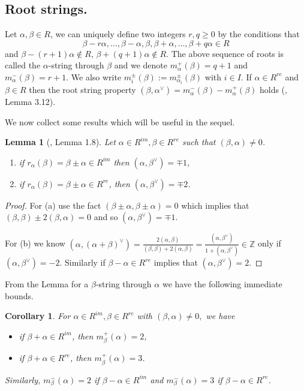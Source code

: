 \documentclass[11pt]{amsart}
\theoremstyle{plain}
\newtheorem{lemma}[thm]{Lemma}
\newtheorem{cor}[thm]{Corollary}
\theoremstyle{definition}
\numberwithin{equation}{section}
\newcommand{\al}{\alpha}
\newcommand{\be}{\beta}
\newcommand{\Z}{\mbox{$\mathbb Z$}}
\begin{document}
\subsection{Root strings.}	Let $\al,\be\in R$, we can uniquely define two integers $r,q\geq0$ by the conditions that $$\be-r\al,\ldots,\be-\al,\be,\be+\al,\ldots,\be+q\al\in R$$ and $\be-(r+1)\al\notin R$, $\be+(q+1)\al\notin R$. The above sequence of roots is called the $\al$-string through $\be$ and we denote $m_{\al}^+(\be)=q+1$ and $m_{\al}^-(\be)=r+1$. We also write $m_i^{\pm}(\be):=m_{\al_i}^{\pm}(\be)$ with $i\in I$. If $\al\in R^{re}$ and $\be\in R$ then the root string property $(\be,\al^{\vee})=m_{\al}^-(\be)-m_{\al}^+(\be)$ holds (\cite{yousofzadeh2017locally}, Lemma 3.12).

	We now collect some results which will be useful in the sequel.
	\begin{lemma}[\cite{serganova1996generalizations}, Lemma 1.8]\label{lem2} Let $\al\in R^{im},\be\in R^{re}$ such that $(\be,\al)\neq 0$.
		\begin{enumerate}
			\item if $r_{\al}(\be)=\be\pm\al\in R^{im}$ then $(\al,\be^{\vee})=\mp1$,
			\item if $r_{\al}(\be)=\be\pm\al\in R^{re}$, then $(\al,\be^{\vee})=\mp2$.
		\end{enumerate}
	\end{lemma}
	\begin{proof} For (a) use the fact $(\be\pm\al,\be\pm\al)=0$ which implies that $(\be,\be)\pm2(\be,\al)=0$ and so $(\al,\be^{\vee})=\mp1$. 
		
		For (b) we know $(\al,(\al+\be)^{\vee})=\frac{2(\al,\be)}{(\be,\be)+2(\al,\be)}=\frac{(\al,\be^{\vee})}{1+(\al,\be^{\vee})}\in\Z$	only if $(\al,\be^{\vee})=-2$. Similarly if $\be-\al\in R^{re}$ implies that $(\al,\be^{\vee})=2$.
	\end{proof}
From the Lemma for a $\be$-string through $\al$ we have the following immediate bounds.
    \begin{cor}\label{cor1}
		For $\al\in R^{im},\be\in R^{re}$ with $(\be,\al)\neq0,$ we have
		\begin{itemize}
			\item[(a)] if $\be+\al\in R^{im}$, then $m_{\be}^+(\al)=2$,
			\item [(b)] if $\be+\al\in R^{re}$, then $m_{\be}^+(\al)=3$.
		\end{itemize}
		Similarly, $m_{\be}^-(\al)=2$ if $\be-\al\in R^{im}$ and $m_{\be}^-(\al)=3$ if $\be-\al\in R^{re}$.
	\end{cor}
\end{document}
